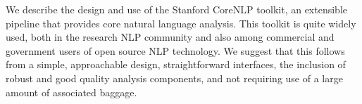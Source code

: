 We describe the design and use of the Stanford CoreNLP toolkit, an extensible pipeline that provides core natural language analysis. This toolkit is quite widely used, both in the research NLP community and also among commercial and government users of open source NLP technology. We suggest that this follows from a simple, approachable design, straightforward interfaces, the inclusion of robust and good quality analysis components, and not requiring use of a large amount of associated baggage.
